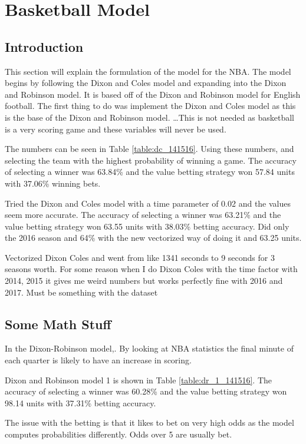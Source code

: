 \chapter{Basketball Model}

\section{Introduction}
This section will explain the formulation of the model for the NBA.  The model begins by following the Dixon and Coles model and expanding into the Dixon and Robinson model.  It is based off of the Dixon and Robinson model for English football.  The first thing to do was implement the Dixon and Coles model as this is the base of the Dixon and Robinson model.  \ldots  This is not needed as basketball is a very scoring game and these variables will never be used.



The numbers can be seen in Table \ref{table:dc_141516}.  Using these numbers, and selecting the team with the highest probability of winning a game.  The accuracy of selecting a winner was 63.84\% and the value betting strategy won 57.84 units with 37.06\% winning bets.

Tried the Dixon and Coles model with a time parameter of 0.02 and the values seem more accurate.  The accuracy of selecting a winner was 63.21\% and the value betting strategy won 63.55 units with 38.03\% betting accuracy.  Did only the 2016 season and 64\% with the new vectorized way of doing it and 63.25 units.

Vectorized Dixon Coles and went from like 1341 seconds to 9 seconds for 3 seasons worth.  For some reason when I do Dixon Coles with the time factor with 2014, 2015 it gives me weird numbers but works perfectly fine with 2016 and 2017.  Must be something with the dataset

\section{Some Math Stuff}

In the Dixon-Robinson model,.  By looking at NBA statistics the final minute of each quarter is likely to have an increase in scoring.


Dixon and Robinson model 1 is shown in Table \ref{table:dr_1_141516}.  The accuracy of selecting a winner was 60.28\% and the value betting strategy won 98.14 units with 37.31\% betting accuracy.

The issue with the betting is that it likes to bet on very high odds as the model computes probabilities differently.  Odds over 5 are usually bet.


